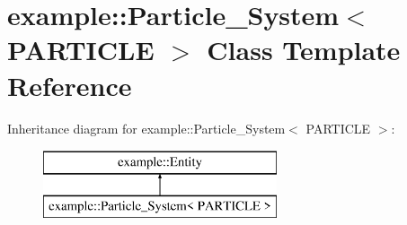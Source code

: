 \hypertarget{classexample_1_1_particle___system}{}\section{example\+::Particle\+\_\+\+System$<$ P\+A\+R\+T\+I\+C\+LE $>$ Class Template Reference}
\label{classexample_1_1_particle___system}
Inheritance diagram for example\+::Particle\+\_\+\+System$<$ P\+A\+R\+T\+I\+C\+LE $>$\+:\begin{figure}[H]
\begin{center}
\leavevmode
\includegraphics[height=2.000000cm]{classexample_1_1_particle___system}
\end{center}
\end{figure}

